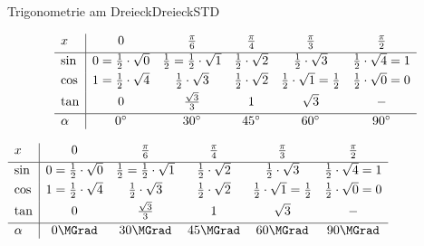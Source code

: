 \begin{MXContent}{Trigonometrie am Dreieck}{Dreieck}{STD}
\ifttm
\begin{MDirectHTML}
\[
\begin{array}[t]{l|*{5}{c}}
 x            & 0                          & \tfrac{\pi}{6}             & \tfrac{\pi}{4}             & \tfrac{\pi}{3}             & \tfrac{\pi}{2}             \\[1mm] \hline
         \sin & 0 = \frac{1}{2} \cdot \sqrt{0} & \frac{1}{2} = \frac{1}{2} \cdot \sqrt{1} & \frac{1}{2} \cdot \sqrt{2} & \frac{1}{2} \cdot \sqrt{3} & \frac{1}{2} \cdot \sqrt{4} = 1 \\[1mm]
         \cos & 1 = \frac{1}{2} \cdot \sqrt{4} & \frac{1}{2} \cdot \sqrt{3} & \frac{1}{2} \cdot \sqrt{2} & \frac{1}{2} \cdot \sqrt{1} = \frac{1}{2} & \frac{1}{2} \cdot \sqrt{0} = 0 \\[1mm]
         \tan & 0                          & \frac{\sqrt{3}}{3}         & 1                          & \sqrt{3}                   & -                          \\[1mm] \hline
 \alpha       & 0^{\circ}                    & 30^{\circ}                   & 45^{\circ}                   & 60^{\circ}                   & 90^{\circ} %
\end{array}
\]
\end{MDirectHTML}
\else
\begin{center}
       $\begin{array}[t]{l|*{5}{c}}
 x            & 0                          & \Mtfrac{\pi}{6}             & \Mtfrac{\pi}{4}             & \Mtfrac{\pi}{3}             & \Mtfrac{\pi}{2}         \\[1mm] \hline
         \sin & 0 = \frac{1}{2} \cdot \sqrt{0} & \frac{1}{2} = \frac{1}{2} \cdot \sqrt{1} & \frac{1}{2} \cdot \sqrt{2} & \frac{1}{2} \cdot \sqrt{3} & \frac{1}{2} \cdot \sqrt{4} = 1 \\[1mm]
         \cos & 1 = \frac{1}{2} \cdot \sqrt{4} & \frac{1}{2} \cdot \sqrt{3} & \frac{1}{2} \cdot \sqrt{2} & \frac{1}{2} \cdot \sqrt{1} = \frac{1}{2} & \frac{1}{2} \cdot \sqrt{0} = 0 \\[1mm]
         \tan & 0                          & \frac{\sqrt{3}}{3}         & 1                          & \sqrt{3}                   & -                          \\[1mm] \hline
 \alpha       & 0\MGrad                  & 30\MGrad                 & 45\MGrad                 & 60\MGrad                 & 90\MGrad %
        \end{array}$
\end{center}
\fi


\end{MXContent}
